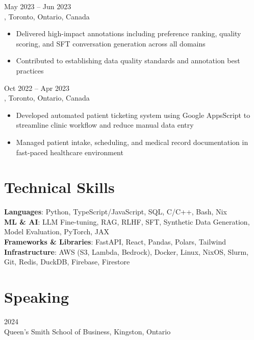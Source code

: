 \documentclass[letterpaper,10pt]{article}
\begin{document}
\hspace{0.15in}{\large\bfseries Data Quality Specialist} \hfill {\small May 2023 -- Jun 2023} \\
\hspace{0.15in}{\bfseries Cohere}, Toronto, Ontario, Canada
\vspace{-1pt}
\begin{itemize}[leftmargin=0.35in, itemsep=-1pt, topsep=1pt, labelsep=0.035in]
\item Delivered high-impact annotations including preference ranking, quality scoring, and SFT conversation generation across all domains
\item Contributed to establishing data quality standards and annotation best practices
\end{itemize}
\vspace{1pt}

\hspace{0.15in}{\large\bfseries Medical Assistant} \hfill {\small Oct 2022 -- Apr 2023} \\
\hspace{0.15in}{\bfseries P\&A Medical}, Toronto, Ontario, Canada
\vspace{-1pt}
\begin{itemize}[leftmargin=0.35in, itemsep=-1pt, topsep=1pt, labelsep=0.035in]
\item Developed automated patient ticketing system using Google AppsScript to streamline clinic workflow and reduce manual data entry
\item Managed patient intake, scheduling, and medical record documentation in fast-paced healthcare environment
\end{itemize}

\section{Technical Skills}

\hspace{0.15in}\textbf{Languages}: Python, TypeScript/JavaScript, SQL, C/C++, Bash, Nix \\
\hspace{0.15in}\textbf{ML \& AI}: LLM Fine-tuning, RAG, RLHF, SFT, Synthetic Data Generation, Model Evaluation, PyTorch, JAX \\
\hspace{0.15in}\textbf{Frameworks \& Libraries}: FastAPI, React, Pandas, Polars, Tailwind \\
\hspace{0.15in}\textbf{Infrastructure}: AWS (S3, Lambda, Bedrock), Docker, Linux, NixOS, Slurm, Git, Redis, DuckDB, Firebase, Firestore

\section{Speaking}

\hspace{0.15in}{\bfseries Guest Lecturer on AI and Synthetic Data Generation for MMA Program} \hfill {\small 2024} \\
\hspace{0.15in}Queen's Smith School of Business, Kingston, Ontario
\end{document}
